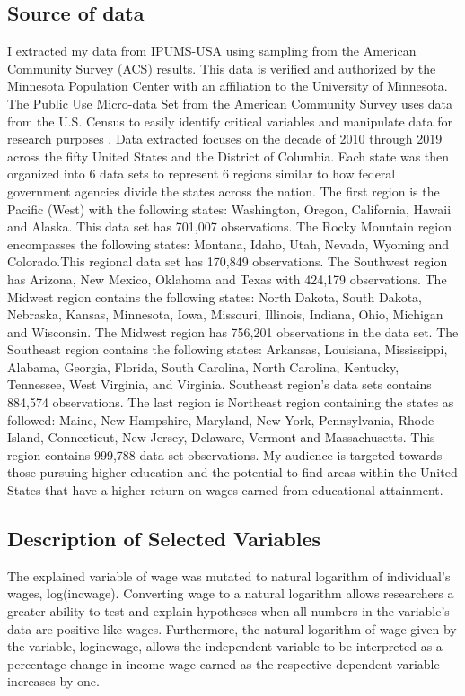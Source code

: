 \documentclass[12pt, English]{article}
\begin{document}
\subsection{Source of data}
I extracted my data from IPUMS-USA using sampling from the American Community Survey (ACS) results. This data is verified and authorized by the Minnesota Population Center with an affiliation to the University of Minnesota. The Public Use Micro-data Set from the American Community Survey uses data from the U.S. Census to easily identify critical variables and manipulate data for research purposes \citep{IPUMSUSA}. Data extracted focuses on the decade of 2010 through 2019 across the fifty United States and the District of Columbia. Each state was then organized into 6 data sets to represent 6 regions similar to how federal government agencies divide the states across the nation. The first region is the Pacific (West) with the following states: Washington, Oregon, California, Hawaii and Alaska. This data set has  701,007 observations. The Rocky Mountain region encompasses the following states: Montana, Idaho, Utah, Nevada, Wyoming and Colorado.This regional data set has 170,849 observations. The Southwest region has Arizona, New Mexico, Oklahoma and Texas with 424,179 observations. The Midwest region contains the following states: North Dakota, South Dakota, Nebraska, Kansas, Minnesota, Iowa, Missouri, Illinois, Indiana, Ohio, Michigan and Wisconsin. The Midwest region has  756,201  observations in the data set. The Southeast region contains the following states: Arkansas, Louisiana, Mississippi, Alabama, Georgia, Florida, South Carolina, North Carolina, Kentucky, Tennessee, West Virginia, and Virginia. Southeast region's data sets contains 884,574  observations. The last region is Northeast region containing the states as followed: Maine, New Hampshire, Maryland, New York, Pennsylvania, Rhode Island, Connecticut, New Jersey, Delaware, Vermont and Massachusetts. This region contains 999,788 data set observations. My audience is targeted towards those pursuing higher education and the potential to find areas within the United States that have a higher return on wages earned from educational attainment.  

\subsection{Description of Selected Variables}

The explained variable of wage was mutated to natural logarithm of individual’s wages, log(incwage). Converting wage to a natural logarithm allows researchers a greater ability to test and explain hypotheses when all numbers in the variable's data are positive like wages. Furthermore, the natural logarithm of wage given by the variable, logincwage, allows the independent variable to be interpreted as a percentage change in income wage earned as the respective dependent variable increases by one. 
\end{document}
